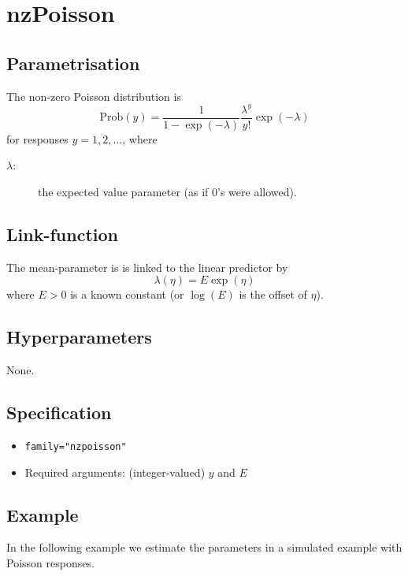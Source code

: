 \documentclass[a4paper,11pt]{article}
\begin{document}
\section*{nzPoisson}

\subsection*{Parametrisation}

The non-zero Poisson distribution is
\begin{displaymath}
    \text{Prob}(y) = \frac{1}{1-\exp(-\lambda)} \frac{\lambda^{y}}{y!}\exp(-\lambda)
\end{displaymath}
for responses $y=1, 2, \ldots$, where
\begin{description}
\item[$\lambda$:] the expected value parameter (as if $0$'s were allowed).
\end{description}

\subsection*{Link-function}

The mean-parameter is
is linked to the linear predictor by
\begin{displaymath}
    \lambda(\eta) = E \exp(\eta)
\end{displaymath}
where $E>0$ is a known constant (or $\log(E)$ is the offset of $\eta$).

\subsection*{Hyperparameters}

None.

\subsection*{Specification}

\begin{itemize}
\item \texttt{family="nzpoisson"}
\item Required arguments: (integer-valued) $y$ and $E$
\end{itemize}

\subsection*{Example}

In the following example we estimate the parameters in a simulated
example with Poisson responses.

\end{document}
